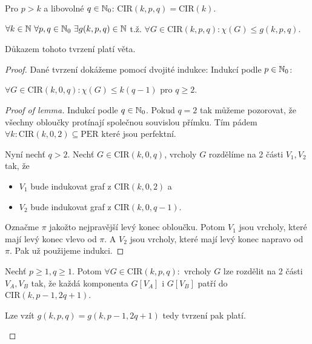 \begin{observ}
	Pro $p > k$ a libovolné $q \in \mathbb{N}_0$: $\text{CIR}(k,p,q) = \text{CIR}(k)$.
\end{observ}

\begin{claim}
	$\forall k \in \N \ \forall p, q \in \N_0 \ \exists g(k,p,q) \in \N$ t.ž. $\forall G \in \text{CIR}(k,p,q) : \chi(G) \leq g(k,p,q)$.
\end{claim}

\begin{observ}
	Důkazem tohoto tvrzení platí věta.
\end{observ}

\begin{proof}
	Dané tvrzení dokážeme pomocí dvojité indukce: Indukcí podle $p \in \mathbb{N}_0$:
	
	\begin{lemma}
		$\forall G \in \text{CIR}(k,0,q) : \chi (G) \leq k (q-1)$ pro $q \geq 2$.
	\end{lemma}
	
	\begin{proof}[Proof of lemma]
		Indukcí podle $q \in \mathbb{N}_0$. Pokud $q = 2$ tak můžeme pozorovat, že všechny obloučky protínají společnou souvislou přímku. Tím pádem $\forall k : \text{CIR}(k,0,2) \subseteq \text{PER}$ které jsou perfektní.
		
		Nyní nechť $q > 2$. Nechť $G \in \text{CIR}(k, 0, q)$, vrcholy $G$ rozdělíme na 2 části $V_1, V_2$ tak, že
		
		\begin{itemize}
			\item $V_1$ bude indukovat graf z $\text{CIR}(k,0,2)$ a
			\item $V_2$ bude indukovat graf z $\text{CIR}(k,0,q-1)$.
		\end{itemize}
		
		Označme $\pi$ jakožto nejpravější levý konec obloučku. Potom $V_1$ jsou vrcholy, které mají levý konec vlevo od $\pi$. A $V_2$ jsou vrcholy, které mají levý konec napravo od $\pi$. Pak už použijeme indukci.
	\end{proof}
	
	\begin{lemma}
		Nechť $p \geq 1, q \geq 1$. Potom $\forall G \in \text{CIR}(k,p,q):$ vrcholy $G$ lze rozdělit na 2 části $V_A, V_B$ tak, že každá komponenta $G[V_A]$ i $G[V_B]$ patří do $\text{CIR}(k, p-1, 2q+1)$.
	\end{lemma}
	
	\begin{cor}
		Lze vzít $g(k,p,q) = g (k, p-1, 2q+1)$ tedy tvrzení pak platí.
	\end{cor}
	

\end{proof}
